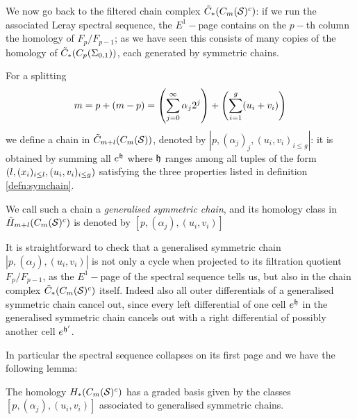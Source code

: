We now go back to the filtered chain complex $\tilde{C}_*(C_m(\mathcal{S})^c)$:
if we run the associated Leray spectral sequence,
the $E^1-$page contains on the $p-$th column the homology of $F_p/F_{p-1}$; as we have seen this consists of
many copies of the homology of $\tilde{C}_*(C_p(\Sigma_{0,1}))$, each generated by symmetric chains.

\begin{defn}
\label{defn:gensymchain}
For a splitting
\[
 m=p+(m-p)=\left(\sum_{j=0}^{\infty}\alpha_j2^j\right)+\left(\sum_{i=1}^g(u_i+v_i)\right)
\]
we define a chain in $\tilde{C}_{m+l}(C_m(\mathcal{S}))$, denoted by $|p,(\alpha_j)_j,(u_i,v_i)_{i\leq g}|$: it
is obtained by summing all $e^{\mathfrak{h}}$ where $\mathfrak{h}$
ranges among all tuples of the form $\left(l,(x_i)_{i\leq l},(u_i,v_i)_{i\leq g}\right)$
satisfying the three properties listed in definition \ref{defn:symchain}.

We call such a chain a
\emph{generalised symmetric chain}, and its homology class in $\tilde{H}_{m+l}(C_m(\mathcal{S})^c)$ is denoted
by $[p,(\alpha_j),(u_i,v_i)]$
\end{defn}

It is straightforward to check that a generalised symmetric chain $|p,(\alpha_j),(u_i,v_i)|$
is not only
a cycle when projected to its filtration quotient $F_p/F_{p-1}$, as the $E^1-$page
of the spectral sequence tells us, but also
in the chain complex $\tilde{C}_*(C_m(\mathcal{S})^c)$ itself. Indeed also all outer
differentials of a generalised symmetric chain cancel out, since
every left differential
of one cell $e^{\mathfrak{h}}$ in the generalised symmetric chain cancels out with a right differential
of possibly another cell $e^{\mathfrak{h}'}$.

In particular the spectral sequence collapses on its first page and
we have the following lemma:
\begin{lem}
\label{lem:gensymchain}
The homology $H_*(C_m(\mathcal{S})^c)$ has a graded basis given by the classes $[p,(\alpha_j),(u_i,v_i)]$
associated to generalised symmetric chains.
\end{lem}

